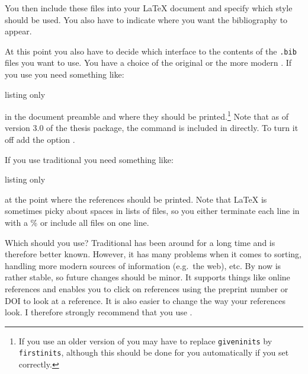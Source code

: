 You then include these files into your \LaTeX{} document and
specify which style should be used.
You also have to indicate where you want the bibliography to appear.

At this point you also have to decide which interface to the contents
of the \texttt{.bib} files you want to use. You have a choice of the
original \BibTeX{} or the more modern
.
If you use  you need something like:
\begin{tcblisting}{listing only}
\usepackage[backend=biber,
  style=numeric-comp, sorting=none, block=ragged, giveninits=true]{biblatex}

\usepackage{ubonn-biblatex}



\end{tcblisting}
\noindent in the document preamble and  where they
should be printed.\footnote{%
If you use an older version of \TeXLive you may have to replace
\texttt{giveninits} by \texttt{firstinits},
although this should be done for you automatically if you set  correctly.}
Note that as of version 3.0 of the thesis package,
the  command is included in  directly.
To turn it off add the option .
\par\noindent
If you use traditional \BibTeX{} you need something like:
\begin{tcblisting}{listing only}

% 

\end{tcblisting}
\noindent at the point where the references should be printed.
Note that \LaTeX{} is sometimes picky about spaces in lists of files,
so you either terminate each line in  with a \% or include all files on one line.

Which should you use?
Traditional \BibTeX{} has been around for a long time and is therefore better known.
However, it has many problems when it comes to sorting,
handling more modern sources of information (e.g.\ the web), etc. 
By now  is rather stable, so future changes should be minor.
It supports things like online references and enables you to click on references
using the preprint number or DOI to look at a reference. It is also
easier to change the way your references look. I therefore
strongly recommend that you use .

